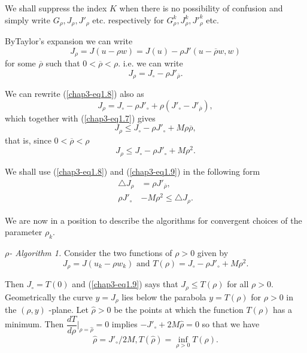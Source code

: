 We shall suppress the index $K$ when there is no possibility of confusion and simply write $G_{\rho}, J_{\rho}, {J'}_{\rho}$ etc. respectively for $G_{\rho}^{k}, J_{\rho}^{k}, {J'}_{\rho}^{k}$ etc.

By\pageoriginale Taylor's expansion we can write
$$
J_{\rho} = J(u - \rho w) = J(u) - \rho J'(u - \overline{\rho} w, w)
$$
for some $\overline{\rho}$ such that $0 < \overline{\rho} < \rho$. i.e. we can write
\begin{equation*}
J_{\rho} = J_{\circ} - \rho {J'}_{\overline{\rho}}.\tag{1.8}\label{chap3-eq1.8}
\end{equation*}

We can rewrite (\ref{chap3-eq1.8}) also as
$$
J_{\rho} = J_{\circ} - \rho{J'}_{\circ} + \rho({J'}_{\circ} - {J'}_{\overline{\rho}}),
$$
which together with (\ref{chap3-eq1.7}) gives
$$
J_{\rho} \leq J_{\circ} - \rho {J'}_{\circ} + M \rho \overline{\rho},
$$
that is, since $0 < \overline{\rho} < \rho$
\begin{equation*}
J_{\rho} \leq J_{\circ} - \rho{J'}_{\circ} + M\rho^{2}.\tag{1.9}\label{chap3-eq1.9}
\end{equation*}

We shall use (\ref{chap3-eq1.8}) and (\ref{chap3-eq1.9}) in the following form
\begin{align*}
\triangle J_{\rho} & = \rho{J'}_{\overline{\rho}},\tag*{$(1.8)'$}\label{chap3-eq1.8'}\\
\rho {J'}_{\circ} & - M \rho^{2} \leq \triangle J_{\rho}.\tag*{$(1.9)'$}\label{chap3-eq1.9'}
\end{align*}

We are now in a position to describe the algorithms for convergent choices of the parameter $\rho_{k}$.

{\em $\rho$- Algorithm 1.} Consider the two functions of $\rho > 0$ given by
$$
J_{\rho} = J(u_{k} - \rho w_{k}) \text{ and } T(\rho) = J_{\circ} - \rho{J'}_{\circ} + M \rho^{2}.
$$

Then $J_{\circ} = T(0)$ and (\ref{chap3-eq1.9}) says that $J_{\rho} \leq T(\rho)$ for all $\rho > 0$. Geometrically the curve $y = J_{\rho}$ lies below the parabola $y = T(\rho)$ for $\rho > 0$ in the $(\rho, y)$ -plane. Let $\hat{\rho} > 0$ be the points at which the function $T(\rho)$ has a minimum. Then $\dfrac{dT}{d\rho}|_{\rho = \hat{\rho}} = 0$ implies $-{J'}_{\circ} + 2M\hat{\rho} = 0$ so that we have
\begin{equation*}
\hat{\rho} = {J'}_{\circ} / 2M, T(\hat{\rho}) = \inf\limits_{\rho > 0} T(\rho).\tag{1.10}\label{chap3-eq1.10}
\end{equation*}\pageoriginale

